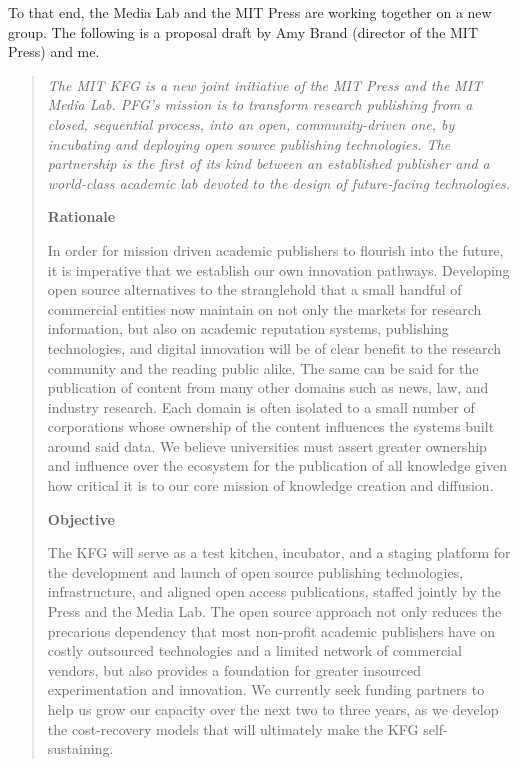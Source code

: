 To that end, the Media Lab and the MIT Press are working together on a new group. The following is a proposal draft by Amy Brand (director of the MIT Press) and me. \\

\begin{quote}
\emph{The MIT \ac{KFG} is a new joint initiative of the MIT Press and the MIT Media Lab. PFG's mission is to transform research publishing from a closed, sequential process, into an open, community-driven one, by incubating and deploying open source publishing technologies. The partnership is the first of its kind between an established publisher and a world-class academic lab devoted to the design of future-facing technologies.}

\textbf{Rationale}

In order for mission driven academic publishers to flourish into the future, it is imperative that we establish our own innovation pathways. Developing open source alternatives to the stranglehold that a small handful of commercial entities now maintain on not only the markets for research information, but also on academic reputation systems, publishing technologies, and digital innovation will be of clear benefit to the research community and the reading public alike. The same can be said for the publication of content from many other domains such as news, law, and industry research. Each domain is often isolated to a small number of corporations whose ownership of the content influences the systems built around said data. We believe universities must assert greater ownership and influence over the ecosystem for the publication of all knowledge given how critical it is to our core mission of knowledge creation and diffusion.
 
\textbf{Objective}

The \ac{KFG} will serve as a test kitchen, incubator, and a staging platform for the development and launch of open source publishing technologies, infrastructure, and aligned open access publications, staffed jointly by the Press and the Media Lab. The open source approach not only reduces the precarious dependency that most non-profit academic publishers have on costly outsourced technologies and a limited network of commercial vendors, but also provides a foundation for greater insourced experimentation and innovation. We currently seek funding partners to help us grow our capacity over the next two to three years, as we develop the cost-recovery models that will ultimately make the \ac{KFG} self-sustaining.


\end{quote}
